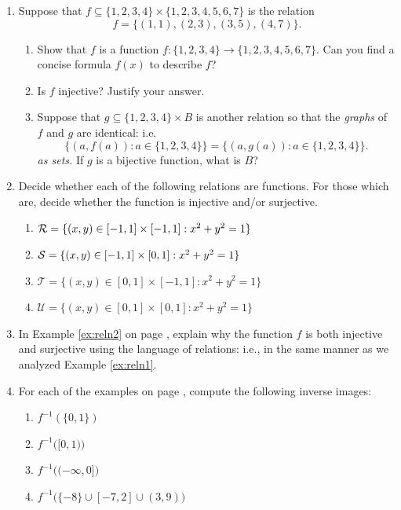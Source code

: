 \begin{exercises}{}{}

\begin{enumerate}
  \item Suppose that $f\subseteq\{1,2,3,4\}\times\{1,2,3,4,5,6,7\}$ is the relation
  \[f=\{(1,1),(2,3),(3,5),(4,7)\}.\]
  \begin{enumerate}
    \item Show that $f$ is a function $f:\{1,2,3,4\}\to\{1,2,3,4,5,6,7\}$. Can you find a concise formula $f(x)$ to describe $f$?
    \item Is $f$ injective? Justify your answer.
    \item Suppose that $g\subseteq\{1,2,3,4\}\times B$ is another relation so that the \emph{graphs} of $f$ and $g$ are identical: i.e.
    \[\bigl\{(a,f(a)):a\in\{1,2,3,4\}\bigr\}=\bigl\{(a,g(a)):a\in\{1,2,3,4\}\bigr\}.\] \emph{as sets.} If $g$ is a bijective function, what is $B$?
  \end{enumerate}
  
  \item Decide whether each of the following relations are functions. For those which are, decide whether the function is injective and/or surjective.
  \begin{enumerate}
    \item $\mathcal{R}=\{(x,y)\in[-1,1]\times[-1,1]:x^2+y^2=1\}$
    \item $\mathcal{S}=\{(x,y)\in[-1,1]\times[0,1]:x^2+y^2=1\}$
    \item $\mathcal T=\{(x,y)\in[0,1]\times[-1,1]:x^2+y^2=1\}$
    \item $\mathcal U=\{(x,y)\in[0,1]\times[0,1]:x^2+y^2=1\}$
  \end{enumerate}
  
  \item In Example \ref{ex:reln2} on page \pageref{ex:reln2}, explain why the function $f$ is both injective and surjective using the language of relations: i.e., in the same manner as we analyzed Example \ref{ex:reln1}.
  
  \item For each of the examples on page \pageref{ex:reln2}, compute the following inverse images:
  \begin{enumerate}
    \item $f^{-1}(\{0,1\})$
    \item $f^{-1}\Big([0,1)\Big)$
    \item $f^{-1}\Big((-\infty,0]\Big)$
    \item $f^{-1}\Big(\{-8\}\cup[-7,2]\cup (3,9)\Big)$
  \end{enumerate}
  

\end{enumerate}
\end{exercises}
